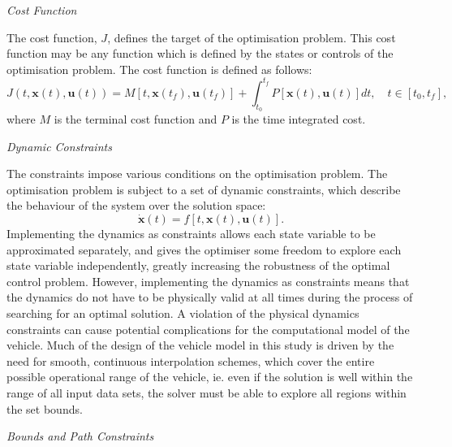 \noindent \textit{Cost Function}

\noindent The cost function, $J$, defines the target of the optimisation problem. 
This cost function may be any function which is defined by the states or controls of the optimisation problem. The cost function is defined as follows:
\begin{equation} \label{eq:cost}
J(t,\textbf{x}(t),\textbf{u}(t)) = M[t,\textbf{x}(t_f),\textbf{u}(t_f)] +   \int_{t_0}^{t_f} P[\textbf{x}(t),\textbf{u}(t)] dt, \quad t \in [t_0,t_f],
\end{equation}
where $M$ is the terminal cost function and $P$ is the time integrated cost. 

\noindent \textit{Dynamic Constraints}

\noindent The constraints impose various conditions on the optimisation problem.
The optimisation problem is subject to a set of dynamic constraints, which describe the behaviour of the system over the solution space:
\begin{equation} \label{eq:state}
\dot{\textbf{x}}(t) = f[t,\textbf{x}(t),\textbf{u}(t)].
\end{equation}
Implementing the dynamics as constraints allows each state variable to be approximated separately, and gives the optimiser some freedom to explore each state variable independently, greatly increasing the robustness of the optimal control problem. However, implementing the dynamics as constraints means that the dynamics do not have to be physically valid at all times during the process of searching for an optimal solution. A violation of the physical dynamics constraints can cause potential complications for the computational model of the vehicle. Much of the design of the vehicle model in this study is driven by the need for smooth, continuous interpolation schemes, which cover the entire possible operational range of the vehicle, ie. even if the solution is well within the range of all input data sets, the solver must be able to explore all regions within the set bounds. 

\noindent \textit{Bounds and Path Constraints}

